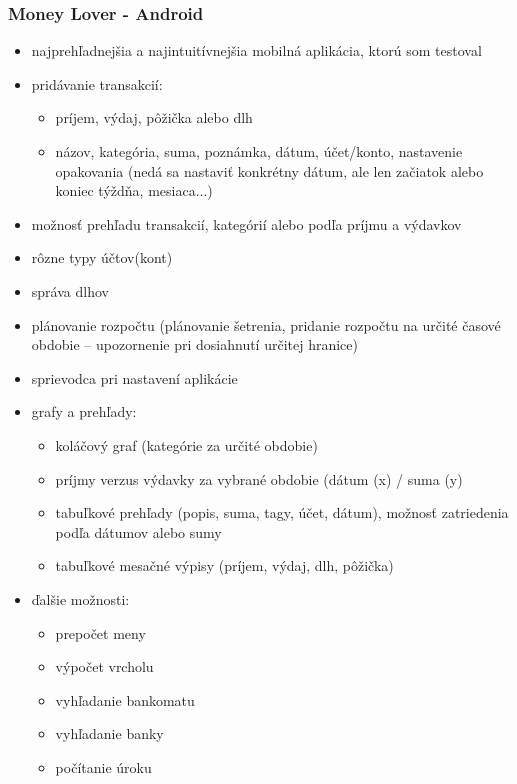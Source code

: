 \documentclass[12pt]{book}
\begin{document}
\subsubsection{Money Lover - Android \cite{MoneyLover}\ }
\begin{itemize}
\item{najprehľadnejšia a najintuitívnejšia mobilná aplikácia, ktorú som testoval}
\item{pridávanie transakcií:}
\begin{itemize}
\item{príjem, výdaj, pôžička alebo dlh}
\item{názov, kategória, suma, poznámka, dátum, účet/konto, nastavenie opakovania (nedá sa nastaviť konkrétny dátum, ale len začiatok alebo koniec týždňa, mesiaca...)}
\end{itemize}
\item{možnosť prehľadu transakcií, kategórií alebo podľa príjmu a výdavkov}
\item{rôzne typy účtov(kont)}
\item{správa dlhov}
\item{plánovanie rozpočtu (plánovanie šetrenia, pridanie rozpočtu na určité časové obdobie – upozornenie pri dosiahnutí určitej hranice)}
\item{sprievodca pri nastavení aplikácie}
\item{grafy a prehľady:}
\begin{itemize}
\item{koláčový graf (kategórie za určité obdobie)}
\item{príjmy verzus výdavky za vybrané obdobie (dátum (x) / suma (y)}
\item{tabuľkové prehľady (popis, suma, tagy, účet, dátum), možnosť zatriedenia podľa dátumov alebo sumy}
\item{tabuľkové mesačné výpisy (príjem, výdaj, dlh, pôžička)}
\end{itemize}
\item{ďalšie možnosti:}
\begin{itemize}
\item{prepočet meny}
\item{výpočet vrcholu}
\item{vyhľadanie bankomatu}
\item{vyhľadanie banky}
\item{počítanie úroku}
\end{itemize}
\end{itemize}
\end{document}
